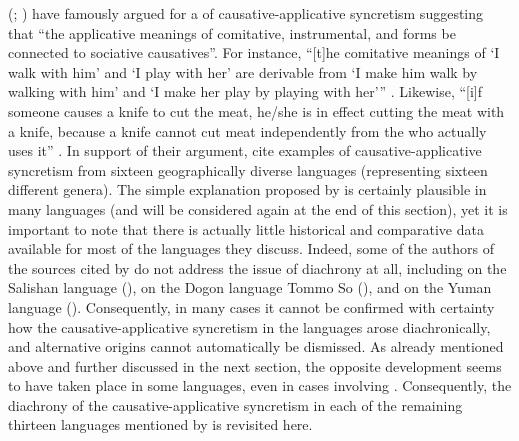 \citeauthor{shibatani:pardeshi:2001} (\citeyear{shibatani:pardeshi:2001}; \citeyear[118]{shibatani:pardeshi:2002}) have famously argued for a  of causative-applicative syncretism suggesting that “the applicative meanings of comitative, instrumental, and  forms be connected to sociative causatives”. For instance, “[t]he comitative meanings of ‘I walk with him’ and ‘I play with her’ are derivable from ‘I make him walk by walking with him’ and ‘I make her play by playing with her’” \citep[118]{shibatani:pardeshi:2002}. Likewise, “[i]f someone causes a knife to cut the meat, he/she is in effect cutting the meat with a knife, because a knife cannot cut meat independently from the   who actually uses it” \citep[119]{shibatani:pardeshi:2002}. In support of their argument, \citeauthor{shibatani:pardeshi:2002} cite examples of causative-applicative syncretism from sixteen geographically diverse languages (representing sixteen different genera). The simple explanation proposed by \citeauthor{shibatani:pardeshi:2002} is certainly plausible in many languages (and will be considered again at the end of this section), yet it is important to note that there is actually little historical and comparative data available for most of the languages they discuss. Indeed, some of the authors of the sources cited by \citeauthor{shibatani:pardeshi:2002} do not address the issue of diachrony at all, including \citet{saunders:davis:1982} on the Salishan language  (), \citet[392]{plungian:1993} on the Dogon language Tommo So (), and \citet{ichihashi-nakayama:1996} on the Yuman language  (). Consequently, in many cases it cannot be confirmed with certainty how the causative-applicative syncretism in the languages arose diachronically, and alternative origins cannot automatically be dismissed. As already mentioned above and further discussed in the next section, the opposite development seems to have taken place in some languages, even in cases involving . Consequently, the diachrony of the causative-applicative syncretism in each of the remaining thirteen languages mentioned by \citet{shibatani:pardeshi:2002} is revisited here.

